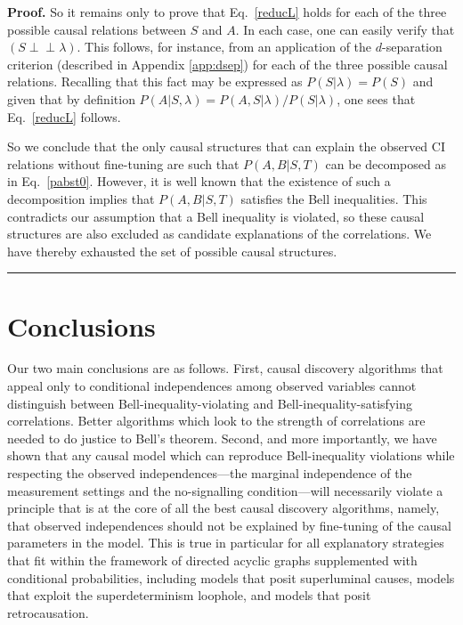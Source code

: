 \documentclass[letterpaper,onecolumn,nofootinbib]{revtex4}
\newenvironment{proof}[1][Proof]{\noindent\textbf{#1.} }{\ \rule{0.5em}{0.5em}}
\def\indep{\perp\!\!\!\!\perp}
\begin{document}
\begin{proof}
So it remains only to prove that Eq.~\eqref{reducL} holds for each of the three possible causal relations between $S$ and $A$.  In each case, one can easily verify that $\left(S \indep \lambda\right)$.  This follows, for instance, from an application of the $d$-separation criterion (described in Appendix \ref{app:dsep}) for each of the three possible causal relations.  Recalling that this fact may be expressed as $P(S|\lambda)=P(S)$ and given that by definition $P(A|S,\lambda)= P(A,S| \lambda)/ P(S|\lambda)$, one sees that Eq.~\eqref{reducL} follows.

So we conclude that the only causal structures that can explain the observed CI relations without fine-tuning are such that $P(A,B|S,T)$ can be decomposed as in Eq.~\eqref{pabst0}.  However, it is well known that the existence of such a decomposition implies that $P(A,B|S,T)$ satisfies the Bell inequalities.  This contradicts our assumption that a Bell inequality is violated, so these causal structures are also excluded as candidate explanations of the correlations.  We have thereby exhausted the set of possible causal structures.
\end{proof}




\section{Conclusions}
\label{sec:conc}

Our two main conclusions are as follows. First, causal discovery
algorithms that appeal only to conditional independences among observed
variables cannot distinguish between Bell-inequality-violating and
Bell-inequality-satisfying correlations. Better algorithms which look to the
strength of correlations are needed to do justice to Bell's theorem.  Second, and more importantly, we have shown that any causal model which can reproduce Bell-inequality violations while respecting the observed independences---the marginal independence of the measurement settings and the no-signalling condition---will necessarily violate a principle that is at the core of all the best causal discovery algorithms, namely, that observed independences should not be explained by fine-tuning of the causal parameters in the model.  This is true in particular for all explanatory strategies that fit within the framework of directed acyclic graphs supplemented with conditional probabilities, including models that posit superluminal causes, models that exploit the superdeterminism loophole, and models that posit retrocausation.
\end{document}
